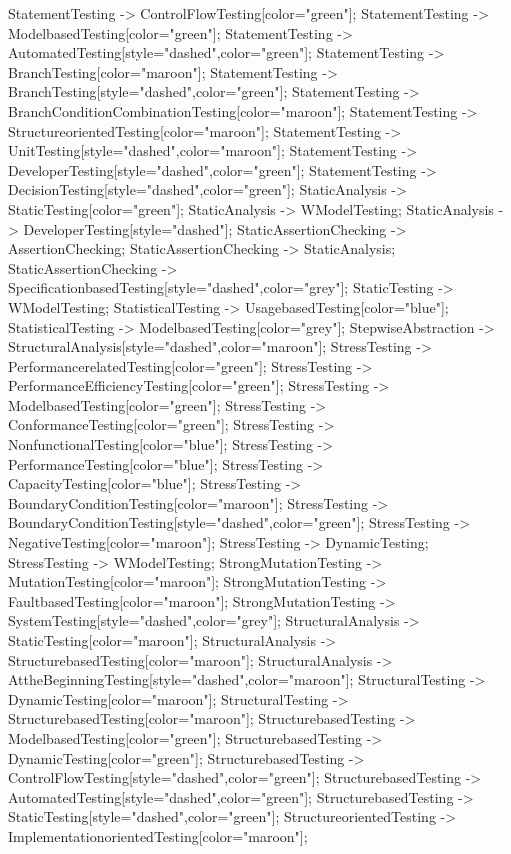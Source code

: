 \documentclass{article}
\begin{document}
{StatementTesting -> ControlFlowTesting[color="green"];
StatementTesting -> ModelbasedTesting[color="green"];
StatementTesting -> AutomatedTesting[style="dashed",color="green"];
StatementTesting -> BranchTesting[color="maroon"];
StatementTesting -> BranchTesting[style="dashed",color="green"];
StatementTesting -> BranchConditionCombinationTesting[color="maroon"];
StatementTesting -> StructureorientedTesting[color="maroon"];
StatementTesting -> UnitTesting[style="dashed",color="maroon"];
StatementTesting -> DeveloperTesting[style="dashed",color="green"];
StatementTesting -> DecisionTesting[style="dashed",color="green"];
StaticAnalysis -> StaticTesting[color="green"];
StaticAnalysis -> WModelTesting;
StaticAnalysis -> DeveloperTesting[style="dashed"];
StaticAssertionChecking -> AssertionChecking;
StaticAssertionChecking -> StaticAnalysis;
StaticAssertionChecking -> SpecificationbasedTesting[style="dashed",color="grey"];
StaticTesting -> WModelTesting;
StatisticalTesting -> UsagebasedTesting[color="blue"];
StatisticalTesting -> ModelbasedTesting[color="grey"];
StepwiseAbstraction -> StructuralAnalysis[style="dashed",color="maroon"];
StressTesting -> PerformancerelatedTesting[color="green"];
StressTesting -> PerformanceEfficiencyTesting[color="green"];
StressTesting -> ModelbasedTesting[color="green"];
StressTesting -> ConformanceTesting[color="green"];
StressTesting -> NonfunctionalTesting[color="blue"];
StressTesting -> PerformanceTesting[color="blue"];
StressTesting -> CapacityTesting[color="blue"];
StressTesting -> BoundaryConditionTesting[color="maroon"];
StressTesting -> BoundaryConditionTesting[style="dashed",color="green"];
StressTesting -> NegativeTesting[color="maroon"];
StressTesting -> DynamicTesting;
StressTesting -> WModelTesting;
StrongMutationTesting -> MutationTesting[color="maroon"];
StrongMutationTesting -> FaultbasedTesting[color="maroon"];
StrongMutationTesting -> SystemTesting[style="dashed",color="grey"];
StructuralAnalysis -> StaticTesting[color="maroon"];
StructuralAnalysis -> StructurebasedTesting[color="maroon"];
StructuralAnalysis -> AttheBeginningTesting[style="dashed",color="maroon"];
StructuralTesting -> DynamicTesting[color="maroon"];
StructuralTesting -> StructurebasedTesting[color="maroon"];
StructurebasedTesting -> ModelbasedTesting[color="green"];
StructurebasedTesting -> DynamicTesting[color="green"];
StructurebasedTesting -> ControlFlowTesting[style="dashed",color="green"];
StructurebasedTesting -> AutomatedTesting[style="dashed",color="green"];
StructurebasedTesting -> StaticTesting[style="dashed",color="green"];
StructureorientedTesting -> ImplementationorientedTesting[color="maroon"];
}
\end{document}
